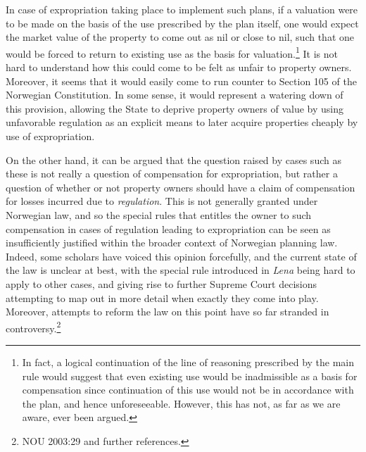 In case of expropriation taking place to implement such plans, if a valuation were to be made on the basis of the use prescribed by the plan itself, one would expect the market value of the property to come out as nil or close to nil, such that one would be forced to return to existing use as the basis for valuation.\footnote{In fact, a logical continuation of the line of reasoning prescribed by the main rule would suggest that even existing use would be inadmissible as a basis for compensation since continuation of this use would not be in accordance with the plan, and hence unforeseeable. However, this has not, as far as we are aware, ever been argued.} It is not hard to understand how this could come to be felt as unfair to property owners. Moreover, it seems that it would easily come to run counter to Section 105 of the Norwegian Constitution. In some sense, it would represent a watering down of this provision, allowing the State to deprive property owners of value by using unfavorable regulation as an explicit means to later acquire properties cheaply by use of expropriation.

On the other hand, it can be argued that the question raised by cases such as these is not really a question of compensation for expropriation, but rather a question of whether or not property owners should have a claim of compensation for losses incurred due to \emph{regulation}. This is not generally granted under Norwegian law, and so the special rules that entitles the owner to such compensation in cases of regulation leading to expropriation can be seen as insufficiently justified within the broader context of Norwegian planning law. Indeed, some scholars have voiced this opinion forcefully, and the current state of the law is unclear at best, with the special rule introduced in \emph{Lena} being hard to apply to other cases, and giving rise to further Supreme Court decisions attempting to map out in more detail when exactly they come into play. Moreover, attempts to reform the law on this point have so far stranded in controversy.\footnote{NOU 2003:29 and further references.}

